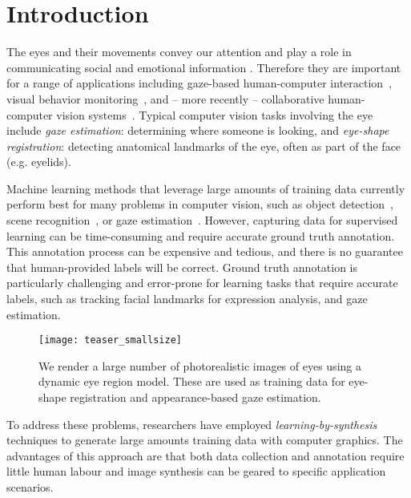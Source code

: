 
\section{Introduction}

The eyes and their movements convey our attention and play a role in communicating social and emotional information \cite{Argyle1965}.
Therefore they are important for a range of applications including gaze-based human-computer interaction~\cite{majaranta14_apc}, visual behavior monitoring~\cite{bulling11_pami}, and -- more recently -- collaborative human-computer vision systems~\cite{papadopoulos2014training,sattar15_cvpr}. 
Typical computer vision tasks involving the eye include \emph{gaze estimation}: determining where someone is looking, and \emph{eye-shape registration}: detecting anatomical landmarks of the eye, often as part of the face (e.g. eyelids).

Machine learning methods that leverage large amounts of training data currently perform best for many problems in computer vision, such as object detection~\cite{girshick2014rich}, scene recognition~\cite{zhou2014learning}, or gaze estimation~\cite{zhang15_cvpr}.
However, capturing data for supervised learning can be time-consuming and require accurate ground truth annotation.
This annotation process can be expensive and tedious, and there is no guarantee that human-provided labels will be correct.
Ground truth annotation is particularly challenging and error-prone for learning tasks that require accurate labels, such as tracking facial landmarks for expression analysis, and gaze estimation.

\begin{figure}
    \texttt{[image: teaser\_smallsize]}
    \caption{We render a large number of photorealistic images of eyes using a dynamic eye region model. These are used as training data for eye-shape registration and appearance-based gaze estimation.}
    \label{fig:teaser}
\end{figure}

To address these problems, researchers have employed \emph{learning-by-synthesis} techniques to generate large amounts training data with computer graphics.
The advantages of this approach are that both data collection and annotation require little human labour and image synthesis can be geared to specific application scenarios.

